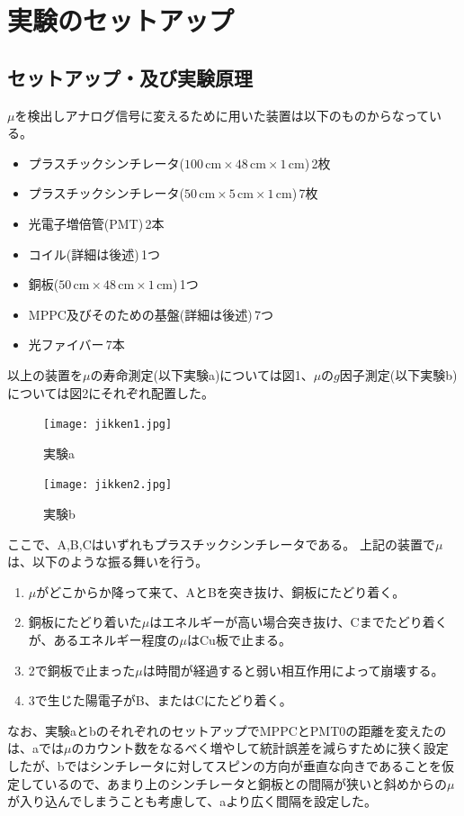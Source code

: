 \section{実験のセットアップ}
\subsection{セットアップ・及び実験原理}
$\mu$を検出しアナログ信号に変えるために用いた装置は以下のものからなっている。
\begin{itemize}
\item プラスチックシンチレータ($100\,\mathrm{cm} \times 48\,\mathrm{cm} \times1\,\mathrm{cm}$)\,2枚
\item プラスチックシンチレータ($50\,\mathrm{cm} \times 5\,\mathrm{cm} \times 1\,\mathrm{cm}$)\,7枚
\item 光電子増倍管(PMT)\,2本
\item コイル(詳細は後述)\,1つ
\item 銅板($50\,\mathrm{cm} \times 48\,\mathrm{cm} \times 1\,\mathrm{cm}$)\,1つ
\item MPPC及びそのための基盤(詳細は後述)\,7つ
\item 光ファイバー\,7本
\end{itemize}
以上の装置を$\mu$の寿命測定(以下実験a)については図1、$\mu$の$g$因子測定(以下実験b)については図2にそれぞれ配置した。
\begin{figure}[H]
\centering
  \texttt{[image: jikken1.jpg]}
  \caption{実験a}
\end{figure}

\begin{figure}[H]
\centering
  \texttt{[image: jikken2.jpg]}
  \caption{実験b}
\end{figure}

ここで、A,B,Cはいずれもプラスチックシンチレータである。
上記の装置で$\mu$は、以下のような振る舞いを行う。
\begin{enumerate}
\item $\mu$がどこからか降って来て、AとBを突き抜け、銅板にたどり着く。
\item 銅板にたどり着いた$\mu$はエネルギーが高い場合突き抜け、Cまでたどり着くが、あるエネルギー程度の$\mu$はCu板で止まる。
\item 2で銅板で止まった$\mu$は時間が経過すると弱い相互作用によって崩壊する。
\item 3で生じた陽電子がB、またはCにたどり着く。
\end{enumerate}
なお、実験aとbのそれぞれのセットアップでMPPCとPMT0の距離を変えたのは、aでは$\mu$のカウント数をなるべく増やして統計誤差を減らすために狭く設定したが、bではシンチレータに対してスピンの方向が垂直な向きであることを仮定しているので、あまり上のシンチレータと銅板との間隔が狭いと斜めからの$\mu$が入り込んでしまうことも考慮して、aより広く間隔を設定した。
